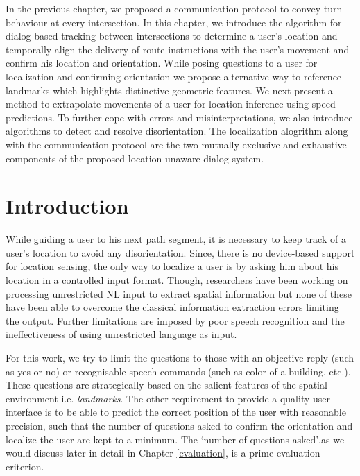 \documentclass{iitkthesis}
\begin{document}
In the previous chapter, we proposed a communication protocol to convey 
turn behaviour at every intersection. In this chapter, we introduce the 
algorithm for dialog-based tracking between intersections to 
determine a user's location and temporally align the delivery of route 
instructions with the user's movement and confirm his location and 
orientation. While posing questions to a user for localization and 
confirming orientation we propose alternative way to reference 
landmarks which highlights distinctive geometric features. We next 
present a method to extrapolate movements of a user for location 
inference using speed predictions. To further cope with errors and 
misinterpretations, we also introduce algorithms to detect and 
resolve disorientation. The localization alogrithm along with the 
communication protocol are the two mutually exclusive and exhaustive 
components of the proposed location-unaware dialog-system. 

\section{Introduction} 
While guiding a user to his next path segment, it is necessary to keep track 
of a user's location to avoid any disorientation. Since, there is no 
device-based support for location sensing, the only way to localize a 
user is by asking him about his location in a controlled input format. 
Though, researchers 
\cite{tellex:language, Kordjamshidi:labelling, matuszek:following} have 
been working on processing unrestricted NL input to extract spatial 
information but none of these have been able to overcome the classical 
information extraction errors limiting the output. Further limitations 
are imposed by poor speech recognition and the ineffectiveness of using 
unrestricted language as input.
 
For this work, we try to limit the questions to those with an objective 
reply (such as yes or no) or recognisable speech commands (such as color 
of a building, etc.). These questions are strategically based on the 
salient features of the spatial environment i.e. \textit{landmarks}. The 
other requirement to provide a quality user interface is to be able to 
predict the correct position of the user with reasonable precision, 
such that the number of questions asked to confirm the orientation and 
localize the user are kept to a minimum. The `number of questions asked',as 
we would discuss later in detail in Chapter \ref{evaluation}, is a 
prime evaluation criterion.
\end{document}

